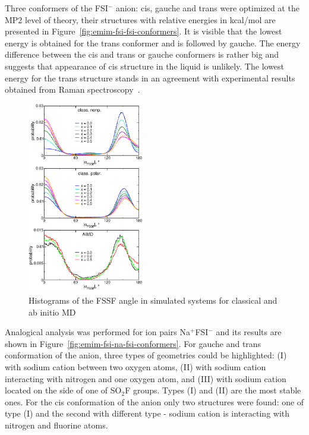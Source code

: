 Three conformers of the FSI$^{-}$ anion: cis, gauche and trans were optimized at the MP2 level of theory, their structures with relative energies in kcal/mol are presented in Figure~\ref{fig:emim-fsi-fsi-conformers}. It is visible that the lowest energy is obtained for the trans conformer and is followed by gauche. The energy difference between the cis and trans or gauche conformers is rather big and suggests that appearance of cis structure in the liquid is unlikely. The lowest energy for the trans structure stands in an agreement with experimental results obtained from Raman spectroscopy~\cite{raman-interactions-2}.

\begin{figure}[ht]
    \centering
    \includegraphics[width=0.45\textwidth]{img/3-structural-data-from-md-simulations/1-emim-fsi/conformers/angle-distribution.png}
    \caption{Histograms of the FSSF angle in simulated systems for classical and ab initio MD}
    \label{fig:emim-fsi-angle-distribution}
\end{figure}

Analogical analysis was performed for ion pairs Na$^{+}$FSI$^{-}$ and its results are shown in Figure~\ref{fig:emim-fsi-na-fsi-conformers}. For gauche and trans conformation of the anion, three types of geometries could be highlighted: (I) with sodium cation between two oxygen atoms, (II) with sodium cation interacting with nitrogen and one oxygen atom, and (III) with sodium cation located on the side of one of SO$_2$F groups. Types (I) and (II) are the most stable ones. For the cis conformation of the anion only two structures were found: one of type (I) and the second with different type - sodium cation is interacting with nitrogen and fluorine atoms.

